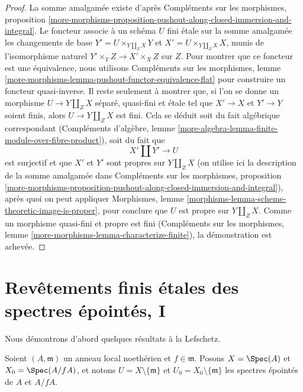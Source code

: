 \begin{proof}
La somme amalgamée existe d'après
Compléments sur les morphismes, proposition
\ref{more-morphisms-proposition-pushout-along-closed-immersion-and-integral}.
Le foncteur associe à un schéma $U$ fini étale sur la
somme amalgamée les changements de base $Y' = U \times_{Y \amalg_Z X} Y$
et $X' = U \times_{Y \amalg_Z X} X$, munis de l'isomorphisme naturel
$Y' \times_Y Z \to X' \times_X Z$ sur $Z$. Pour montrer que ce foncteur
est une équivalence, nous utilisons
Compléments sur les morphismes, lemme
\ref{more-morphisms-lemma-pushout-functor-equivalence-flat}
pour construire un foncteur quasi-inverse.
Il reste seulement à montrer que, si l'on se donne un morphisme
$U \to Y \amalg_Z X$ séparé, quasi-fini et étale
tel que $X' \to X$ et $Y' \to Y$ soient finis,
alors $U \to Y \amalg_Z X$ est fini.
Cela se déduit soit du fait algébrique correspondant
(Compléments d'algèbre, lemme
\ref{more-algebra-lemma-finite-module-over-fibre-product}),
soit du fait que
$$
X' \amalg Y' \to U
$$
est surjectif et que $X'$ et $Y'$ sont propres sur $Y \amalg_Z X$
(on utilise ici la description de la somme amalgamée dans Compléments sur les morphismes, proposition
\ref{more-morphisms-proposition-pushout-along-closed-immersion-and-integral}),
après quoi on peut appliquer
Morphismes, lemme \ref{morphisms-lemma-scheme-theoretic-image-is-proper},
pour conclure que $U$ est propre sur $Y \amalg_Z X$.
Comme un morphisme quasi-fini et propre est fini
(Compléments sur les morphismes, lemme \ref{more-morphisms-lemma-characterize-finite}),
la démonstration est achevée.
\end{proof}





\section{Revêtements finis étales des spectres épointés, I}
\label{section-pi1-punctured-spec}

\noindent
Nous démontrons d'abord quelques résultats à la Lefschetz.

\begin{situation}
\label{situation-local-lefschetz}
Soient $(A, \mathfrak m)$ un anneau local noethérien et $f \in \mathfrak m$.
Posons $X = \Spec(A)$ et $X_0 = \Spec(A/fA)$, et
notons $U = X \setminus \{\mathfrak m\}$ et
$U_0 = X_0 \setminus \{\mathfrak m\}$ les spectres épointés de
$A$ et $A/fA$.
\end{situation}

